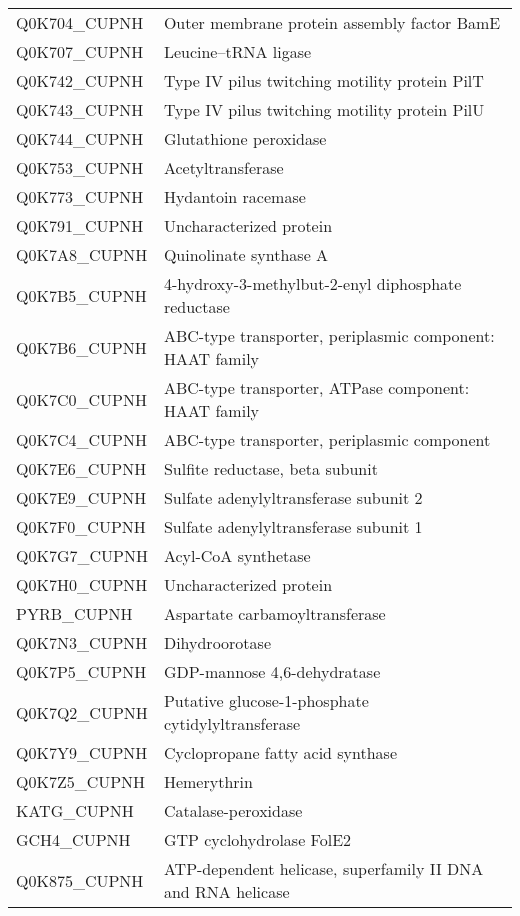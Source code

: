 \begin{center}
\begin{longtable}{ l l }
Q0K704\_CUPNH & Outer membrane protein assembly factor BamE \\ [0.5ex]
Q0K707\_CUPNH & Leucine--tRNA ligase \\ [0.5ex]
Q0K742\_CUPNH & Type IV pilus twitching motility protein PilT \\ [0.5ex]
Q0K743\_CUPNH & Type IV pilus twitching motility protein PilU \\ [0.5ex]
Q0K744\_CUPNH & Glutathione peroxidase \\ [0.5ex]
Q0K753\_CUPNH & Acetyltransferase \\ [0.5ex]
Q0K773\_CUPNH & Hydantoin racemase \\ [0.5ex]
Q0K791\_CUPNH & Uncharacterized protein \\ [0.5ex]
Q0K7A8\_CUPNH & Quinolinate synthase A \\ [0.5ex]
Q0K7B5\_CUPNH & 4-hydroxy-3-methylbut-2-enyl diphosphate reductase \\ [0.5ex]
Q0K7B6\_CUPNH & ABC-type transporter, periplasmic component: HAAT family \\ [0.5ex]
Q0K7C0\_CUPNH & ABC-type transporter, ATPase component: HAAT family \\ [0.5ex]
Q0K7C4\_CUPNH & ABC-type transporter, periplasmic component \\ [0.5ex]
Q0K7E6\_CUPNH & Sulfite reductase, beta subunit \\ [0.5ex]
Q0K7E9\_CUPNH & Sulfate adenylyltransferase subunit 2 \\ [0.5ex]
Q0K7F0\_CUPNH & Sulfate adenylyltransferase subunit 1 \\ [0.5ex]
Q0K7G7\_CUPNH & Acyl-CoA synthetase \\ [0.5ex]
Q0K7H0\_CUPNH & Uncharacterized protein \\ [0.5ex]
PYRB\_CUPNH & Aspartate carbamoyltransferase \\ [0.5ex]
Q0K7N3\_CUPNH & Dihydroorotase \\ [0.5ex]
Q0K7P5\_CUPNH & GDP-mannose 4,6-dehydratase \\ [0.5ex]
Q0K7Q2\_CUPNH & Putative glucose-1-phosphate cytidylyltransferase \\ [0.5ex]
Q0K7Y9\_CUPNH & Cyclopropane fatty acid synthase \\ [0.5ex]
Q0K7Z5\_CUPNH & Hemerythrin \\ [0.5ex]
KATG\_CUPNH & Catalase-peroxidase \\ [0.5ex]
GCH4\_CUPNH & GTP cyclohydrolase FolE2 \\ [0.5ex]
Q0K875\_CUPNH & ATP-dependent helicase, superfamily II DNA and RNA helicase \\ [0.5ex]

\end{longtable}
\end{center}
